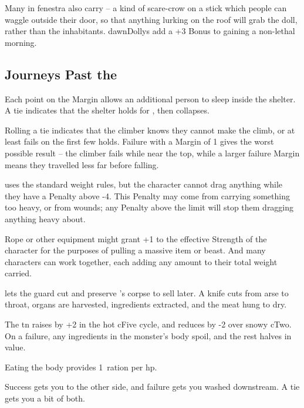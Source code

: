 \begin{multicols}{2}
Many in \gls{fenestra} also carry  -- a kind of scare-crow on a stick which people can waggle outside their door, so that anything lurking on the roof will grab the doll, rather than the inhabitants.
\Glspl{dawnDolly} add a +3 Bonus to gaining a non-lethal morning.


\subsection{Journeys Past the }

Each point on the Margin allows an additional person to sleep inside the shelter.
A tie indicates that the shelter holds for , then collapses.

Rolling a tie indicates that the climber knows they cannot make the climb, or at least fails on the first few holds.
Failure with a Margin of 1 gives the worst possible result -- the climber fails while near the top, while a larger failure Margin means they travelled less far before falling.

uses the standard \gls{weight} rules, but the character cannot drag anything while they have a Penalty above -4.
This Penalty may come from carrying something too heavy, or from wounds; any Penalty above the limit will stop them dragging anything heavy about.

Rope or other equipment might grant +1 to the effective Strength of the character for the purposes of pulling a massive item or beast.
And many characters can work together, each adding any amount to their total \gls{weight} carried.

lets the \gls{guard} cut and preserve 's corpse to sell later.
A knife cuts from arse to throat, organs are harvested, \glspl{ingredient} extracted, and the meat hung to dry.

The \gls{tn} raises by +2 in the hot \gls{cFive} \gls{cycle}, and reduces by -2 over snowy \gls{cTwo}.
On a failure, any \glspl{ingredient} in the \gls{monster}'s body spoil, and the rest halves in value.

Eating the body provides 1~\gls{ration} per \gls{hp}.

Success gets you to the other side, and failure gets you washed downstream.
A tie gets you a bit of both.


\end{multicols}
